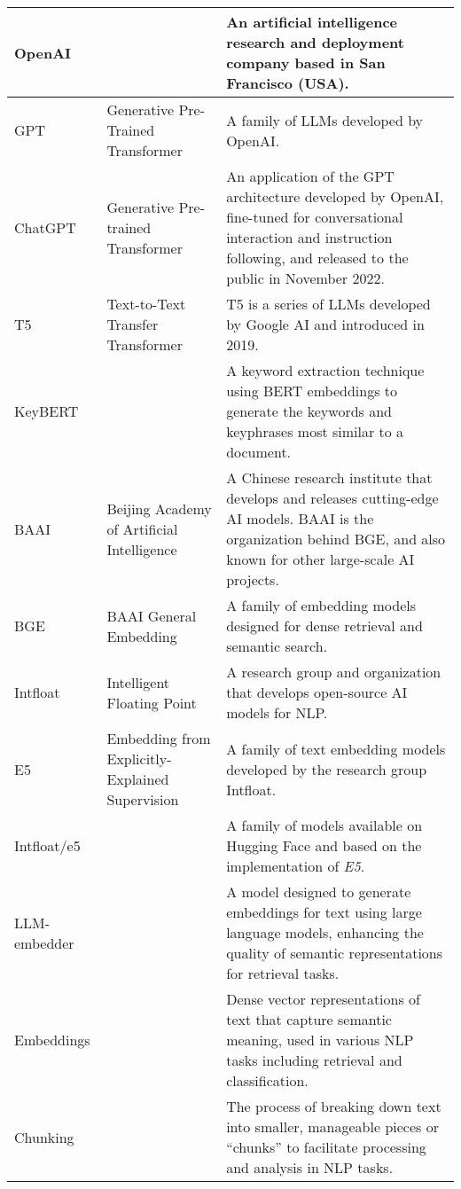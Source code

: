 \begin{tabularx}{\textwidth}{
  >{\raggedright\arraybackslash}p{2.5cm}
  >{\raggedright\arraybackslash}p{4cm}
  >{\noindent\justifying\arraybackslash}X
}
\cmidrule(lr){1-3}
OpenAI & & An artificial intelligence research and deployment company based in San Francisco (USA). \\
\cmidrule(lr){1-3}
GPT   & Generative Pre-Trained Transformer & A family of LLMs developed by OpenAI.\\
\cmidrule(lr){1-3}
ChatGPT & Generative Pre-trained Transformer & An application of the GPT architecture developed by OpenAI, fine-tuned for conversational interaction and instruction following, and released to the public in November 2022. \\
\cmidrule(lr){1-3}
T5    & Text-to-Text Transfer Transformer & T5 is a series of LLMs developed by Google AI and introduced in 2019. \\
\cmidrule(lr){1-3}
KeyBERT & & A keyword extraction technique using BERT embeddings to generate the keywords and keyphrases most similar to a document. \\
\cmidrule(lr){1-3}
BAAI & Beijing Academy of Artificial Intelligence & A Chinese research institute that develops and releases cutting-edge AI models. BAAI is the organization behind BGE, and also known for other large-scale AI projects. \\
\cmidrule(lr){1-3}
BGE   & BAAI General Embedding & A family of embedding models designed for dense retrieval and semantic search. \\
\cmidrule(lr){1-3}
Intfloat & Intelligent Floating Point & A research group and organization that develops open-source AI models for NLP. \\
\cmidrule(lr){1-3}
E5    & Embedding from Explicitly-Explained Supervision & A family of text embedding models developed by the research group Intfloat. \\
\cmidrule(lr){1-3}
Intfloat/e5 & & A family of models available on Hugging Face and based on the implementation of \textit{E5}. \\
\cmidrule(lr){1-3}
LLM-embedder &   & A model designed to generate embeddings for text using large language models, enhancing the quality of semantic representations for retrieval tasks. \\
\cmidrule(lr){1-3}
Embeddings &    & Dense vector representations of text that capture semantic meaning, used in various NLP tasks including retrieval and classification. \\
\cmidrule(lr){1-3}
Chunking &    & The process of breaking down text into smaller, manageable pieces or ``chunks'' to facilitate processing and analysis in NLP tasks. \\

\end{tabularx}
